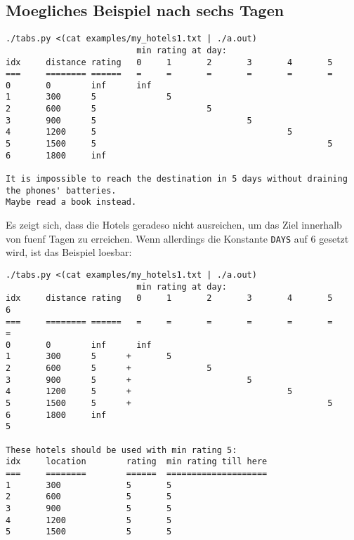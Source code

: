 \documentclass[a4paper,10pt,ngerman]{scrartcl}
\begin{document}
\subsection*{Moegliches Beispiel nach sechs Tagen}
\begin{lstlisting}
./tabs.py <(cat examples/my_hotels1.txt | ./a.out)
                          min rating at day:
idx     distance rating   0     1       2       3       4       5
===     ======== ======   =     =       =       =       =       =
0       0        inf      inf
1       300      5              5
2       600      5                      5
3       900      5                              5
4       1200     5                                      5
5       1500     5                                              5
6       1800     inf

It is impossible to reach the destination in 5 days without draining the phones' batteries.
Maybe read a book instead.
\end{lstlisting}
Es zeigt sich, dass die Hotels geradeso nicht ausreichen, um das Ziel innerhalb von fuenf Tagen zu erreichen.
Wenn allerdings die Konstante \lstinline{DAYS} auf $6$ gesetzt wird, ist das Beispiel loesbar:
\begin{lstlisting}
./tabs.py <(cat examples/my_hotels1.txt | ./a.out)
                          min rating at day:
idx     distance rating   0     1       2       3       4       5       6
===     ======== ======   =     =       =       =       =       =       =
0       0        inf      inf
1       300      5      +       5
2       600      5      +               5
3       900      5      +                       5
4       1200     5      +                               5
5       1500     5      +                                       5
6       1800     inf                                                    5

These hotels should be used with min rating 5:
idx     location        rating  min rating till here
===     ========        ======  ====================
1       300             5       5
2       600             5       5
3       900             5       5
4       1200            5       5
5       1500            5       5
\end{lstlisting}
\end{document}
